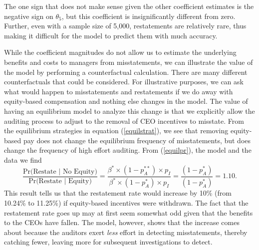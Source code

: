 
The one sign that does not make sense given the other coefficient estimates is the negative sign on $\theta_5$, but this coefficient is insignificantly different from zero.
Further, even with a sample size of 5,000, restatements are relatively rare, thus making it difficult for the model to predict them with much accuracy. 

While the coefficient magnitudes do not allow us to estimate the underlying benefits and costs to managers from misstatements, we can illustrate the value of the model by performing a counterfactual calculation.
There are many different counterfactuals that could be considered. 
For illustrative purposes, we can ask what would happen to misstatements and restatements if we do away with equity-based compensation and nothing else changes in the model.
The value of having an equilibrium model to analyze this change is that we explicitly allow the auditing process to adjust to the removal of CEO incentives to misstate. 
From the equilibrium strategies in equation (\ref{equilstrat}), we see that removing equity-based pay does not change the equilibrium frequency of misstatements, but does change the frequency of high effort auditing.
From (\ref{equilpr}), the model and the data we find
$$ \dfrac{\mbox{Pr(Restate }\vert \mbox{ No Equity)}}{\mbox{Pr(Restate }\vert \mbox{ Equity)}}=\dfrac{\beta^* \times (1-p_A^{**}) \times p_{I}}
{\beta^* \times (1-p_A^{*}) \times p_{I}} = \dfrac{(1-p_A^*)}{(1-p_A^*)} = 1.10.$$
This result tells us that the restatement rate would increase by 10\% (from 10.24\% to 11.25\%) if equity-based incentives were withdrawn. 
The fact that the restatement rate goes up may at first seem somewhat odd given that the benefits to the CEOs have fallen. 
The model, however, shows that the increase  comes about because the auditors exert \emph{less} effort in detecting misstatements, thereby catching fewer, leaving more for subsequent investigations to detect.

